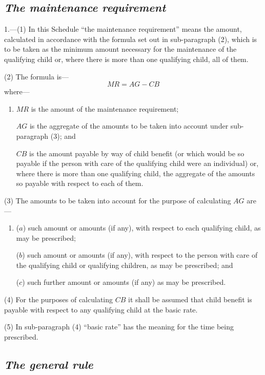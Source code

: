 \documentclass[12pt,a4paper]{article}
\begin{document}
\renewcommand\parthead{ --- Schedule 1 Part I}

\subsection*{\itshape The maintenance requirement}

1.---(1) In this Schedule “the maintenance requirement” means the amount, calculated in accordance with the formula set out in sub-paragraph (2), which is to be taken as the minimum amount necessary for the maintenance of the qualifying child or, where there is more than one qualifying child, all of them.

(2) The formula is—
\[
MR = AG - CB
\]
where—
\begin{enumerate}\item[]
    $MR$ is the amount of the maintenance requirement;

    $AG$ is the aggregate of the amounts to be taken into account under sub-paragraph (3); and

    $CB$ is the amount payable by way of child benefit (or which would be so payable if the person with care of the qualifying child were an individual) or, where there is more than one qualifying child, the aggregate of the amounts so payable with respect to each of them. 
\end{enumerate}

(3) The amounts to be taken into account for the purpose of calculating $AG$ are—
\begin{enumerate}\item[]
($a$) such amount or amounts (if any), with respect to each qualifying child, as may be prescribed;

($b$) such amount or amounts (if any), with respect to the person with care of the qualifying child or qualifying children, as may be prescribed; and

($c$) such further amount or amounts (if any) as may be prescribed.
\end{enumerate}

(4) For the purposes of calculating $CB$ it shall be assumed that child benefit is payable with respect to any qualifying child at the basic rate.

(5) In sub-paragraph (4)  “basic rate” has the meaning for the time being prescribed.


\subsection*{\itshape The general rule}
\end{document}
